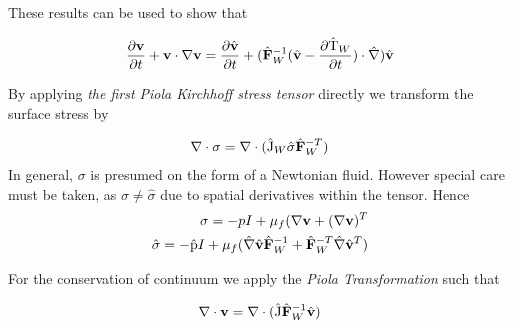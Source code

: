 These results can be used to show that

\begin{align*}
\pder{\mathbf{v}}{t} + \mathbf{v} \cdot \nabla \mathbf{v} =
\pder{\hat{v}}{t} + (\hat{F}_W^{-1}(\hat{v} - \pder{\ha{T}_W}{t}) \cdot \hat{\nabla}) \hat{v}
\end{align*}

By applying \textit{the first Piola Kirchhoff stress tensor} directly we transform the surface stress by 

\begin{align*}
\nabla \cdot \sigma = \nabla \cdot (\ha{J}_W \hat{\sigma}\hat{F}_W^{-T})
\end{align*}
In general, $\sigma$ is presumed on the form of a Newtonian fluid.
However special care must be taken, as $\sigma \neq \hat{\sigma}$ due to spatial derivatives within the tensor. Hence 
\begin{align*}
\sigma = -p I + \mu_f(\nabla \mathbf{v} + (\nabla \mathbf{v})^T \\
\hat{\sigma} = -\ha{p} I + \mu_f(\hat{\nabla}\hat{v}\hat{F}_W^{-1} +\hat{F}_W^{-T}\hat{\nabla}\hat{v}^T )
\end{align*} 

For the conservation of continuum we apply the \textit{Piola Transformation} such that

\begin{align*}
\nabla \cdot \mathbf{v} = \nabla \cdot (\ha{J} \hat{F}_W^{-1} \hat{v})
\end{align*}

